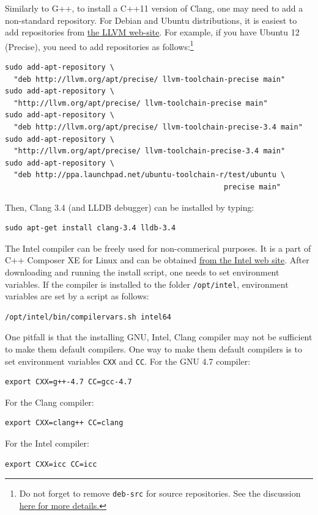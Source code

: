 \documentclass[runningheads,a4paper]{llncs}
\newcommand{\ttt}[1]{\texttt{#1}}
\begin{document}
{Similarly to G++, to install a C++11 version of Clang, one may need to add a non-standard repository.
For Debian and Ubuntu distributions, it is easiest to add repositories from \href{http://llvm.org/apt/}{
the LLVM web-site}. For example, if you have Ubuntu 12 (Precise), you need to add repositories
as follows:\footnote{Do not forget to remove \texttt{deb-src} for source repositories.
See the discussion \href{http://askubuntu.com/questions/160511/why-does-add-apt-repository-fail-to-add-source-repositories}{here for more details.}}
\begin{verbatim}
sudo add-apt-repository \
  "deb http://llvm.org/apt/precise/ llvm-toolchain-precise main"
sudo add-apt-repository \
  "http://llvm.org/apt/precise/ llvm-toolchain-precise main"
sudo add-apt-repository \
  "deb http://llvm.org/apt/precise/ llvm-toolchain-precise-3.4 main"
sudo add-apt-repository \
  "http://llvm.org/apt/precise/ llvm-toolchain-precise-3.4 main"
sudo add-apt-repository \
  "deb http://ppa.launchpad.net/ubuntu-toolchain-r/test/ubuntu \
                                                  precise main"
\end{verbatim}
Then, Clang 3.4 (and LLDB debugger) can be installed by typing:
\begin{verbatim}
sudo apt-get install clang-3.4 lldb-3.4
\end{verbatim}

The Intel compiler can be freely used for non-commerical purposes.
It is a part of C++ Composer XE for Linux and can 
be obtained \href{http://software.intel.com/en-us/non-commercial-software-development}{from the Intel web site}.
After downloading and running the install script, one needs to set environment variables.
If the compiler is installed to the folder \texttt{/opt/intel}, environment variables
are set by a script as follows:
\begin{verbatim}
/opt/intel/bin/compilervars.sh intel64
\end{verbatim}

One pitfall is that the installing GNU, Intel, Clang compiler may not be sufficient to 
make them default compilers.
One way to make them default compilers is to set environment variables \ttt{CXX} and \ttt{CC}.
For the GNU 4.7 compiler:
\begin{verbatim}
export CXX=g++-4.7 CC=gcc-4.7 
\end{verbatim}
For the Clang compiler:
\begin{verbatim}
export CXX=clang++ CC=clang
\end{verbatim}
For the Intel compiler:
\begin{verbatim}
export CXX=icc CC=icc 
\end{verbatim}


}
\end{document}
